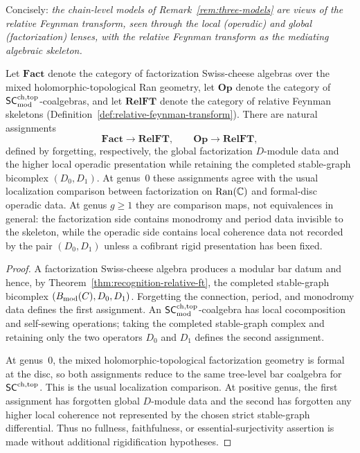 \begin{remark}
Concisely:
\emph{the chain-level models of
Remark~\textup{\ref{rem:three-models}} are views of the
relative Feynman transform, seen through the local
\textup{(}operadic\textup{)} and global
\textup{(}factorization\textup{)} lenses, with the relative
Feynman transform as the mediating algebraic skeleton.}
\end{remark}

\providecommand{\Loc}{\operatorname{Loc}}

\begin{proposition}
\label{prop:functorial-triangle}
Let $\mathbf{Fact}$ denote the category of factorization
Swiss-cheese algebras over the mixed holomorphic-topological
Ran geometry, let $\mathbf{Op}$ denote the category of
$\mathsf{SC}^{\mathrm{ch,top}}_{\mathrm{mod}}$-coalgebras, and let $\mathbf{RelFT}$
denote the category of relative Feynman skeletons
\textup{(}Definition~\textup{\ref{def:relative-feynman-transform}}\textup{)}.
There are natural assignments
\[
\mathbf{Fact}\longrightarrow \mathbf{RelFT},
\qquad
\mathbf{Op}\longrightarrow \mathbf{RelFT},
\]
defined by forgetting, respectively, the global factorization
$D$-module data and the higher local operadic presentation while
retaining the completed stable-graph bicomplex $(D_0,D_1)$.
At genus~$0$ these assignments agree with the usual localization
comparison between factorization on $\operatorname{Ran}(\mathbb{C})$ and formal-disc
operadic data. At genus $g\ge 1$ they are comparison maps, not
equivalences in general: the factorization side contains monodromy
and period data invisible to the skeleton, while the operadic side
contains local coherence data not recorded by the pair $(D_0,D_1)$
unless a cofibrant rigid presentation has been fixed.
\end{proposition}

\begin{proof}
A factorization Swiss-cheese algebra produces a modular bar
datum and hence, by Theorem~\ref{thm:recognition-relative-ft},
the completed stable-graph bicomplex $(B_{\mathrm{mod}}(C),D_0,D_1)$.
Forgetting the connection, period, and monodromy data defines
the first assignment. An $\mathsf{SC}^{\mathrm{ch,top}}_{\mathrm{mod}}$-coalgebra
has local cocomposition and self-sewing operations; taking the
completed stable-graph complex and retaining only the two
operators $D_0$ and $D_1$ defines the second assignment.

At genus~$0$, the mixed holomorphic-topological factorization
geometry is formal at the disc, so both assignments reduce to
the same tree-level bar coalgebra for $\mathsf{SC}^{\mathrm{ch,top}}$. This is the
usual localization comparison. At positive genus, the first
assignment has forgotten global $D$-module data and the second
has forgotten any higher local coherence not represented by the
chosen strict stable-graph differential. Thus no fullness,
faithfulness, or essential-surjectivity assertion is made without
additional rigidification hypotheses.
\end{proof}


